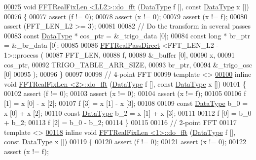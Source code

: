 \begin{DoxyCode}
\hypertarget{a00098_source_l00075}{}\hyperlink{a00011_a4dac6eeb56e818d668ba9dcec456751c}{00075} \textcolor{keywordtype}{void}    \hyperlink{a00011}{FFTRealFixLen <LL2>::do\_fft} (\hyperlink{a00011_a1aee47aa93a19226faec1c1bf91a6bd4}{DataType} f [], \textcolor{keyword}{const} 
      \hyperlink{a00011_a1aee47aa93a19226faec1c1bf91a6bd4}{DataType} x [])
00076 \{
00077     assert (f != 0);
00078     assert (x != 0);
00079     assert (x != f);
00080     assert (FFT\_LEN\_L2 >= 3);
00081 
00082     \textcolor{comment}{// Do the transform in several passes}
00083     \textcolor{keyword}{const} \hyperlink{a00011_a1aee47aa93a19226faec1c1bf91a6bd4}{DataType}  *   cos\_ptr = &\_trigo\_data [0];
00084     \textcolor{keyword}{const} \textcolor{keywordtype}{long} *    br\_ptr = &\_br\_data [0];
00085 
00086     \hyperlink{a00013}{FFTRealPassDirect} <FFT\_LEN\_L2 - 1>::process (
00087         FFT\_LEN,
00088         f,
00089         &\_buffer [0],
00090         x,
00091         cos\_ptr,
00092         TRIGO\_TABLE\_ARR\_SIZE,
00093         br\_ptr,
00094         &\_trigo\_osc [0]
00095     );
00096 \}
00097 
00098 \textcolor{comment}{// 4-point FFT}
00099 \textcolor{keyword}{template} <>
\hypertarget{a00098_source_l00100}{}\hyperlink{a00011_a436ff687a3bc42453bec760d6f1603e6}{00100} \textcolor{keyword}{inline} \textcolor{keywordtype}{void} \hyperlink{a00011}{FFTRealFixLen <2>::do\_fft} (\hyperlink{a00011_a1aee47aa93a19226faec1c1bf91a6bd4}{DataType} f [], \textcolor{keyword}{const} 
      \hyperlink{a00011_a1aee47aa93a19226faec1c1bf91a6bd4}{DataType} x [])
00101 \{
00102     assert (f != 0);
00103     assert (x != 0);
00104     assert (x != f);
00105 
00106     f [1] = x [0] - x [2];
00107     f [3] = x [1] - x [3];
00108 
00109     \textcolor{keyword}{const} \hyperlink{a00011_a1aee47aa93a19226faec1c1bf91a6bd4}{DataType}  b\_0 = x [0] + x [2];
00110     \textcolor{keyword}{const} \hyperlink{a00011_a1aee47aa93a19226faec1c1bf91a6bd4}{DataType}  b\_2 = x [1] + x [3];
00111     
00112     f [0] = b\_0 + b\_2;
00113     f [2] = b\_0 - b\_2;
00114 \}
00115 
00116 \textcolor{comment}{// 2-point FFT}
00117 \textcolor{keyword}{template} <>
\hypertarget{a00098_source_l00118}{}\hyperlink{a00011_ac13fd7827a9a590c2de1a749ad325492}{00118} \textcolor{keyword}{inline} \textcolor{keywordtype}{void} \hyperlink{a00011}{FFTRealFixLen <1>::do\_fft} (\hyperlink{a00011_a1aee47aa93a19226faec1c1bf91a6bd4}{DataType} f [], \textcolor{keyword}{const} 
      \hyperlink{a00011_a1aee47aa93a19226faec1c1bf91a6bd4}{DataType} x [])
00119 \{
00120     assert (f != 0);
00121     assert (x != 0);
00122     assert (x != f);

\end{DoxyCode}
